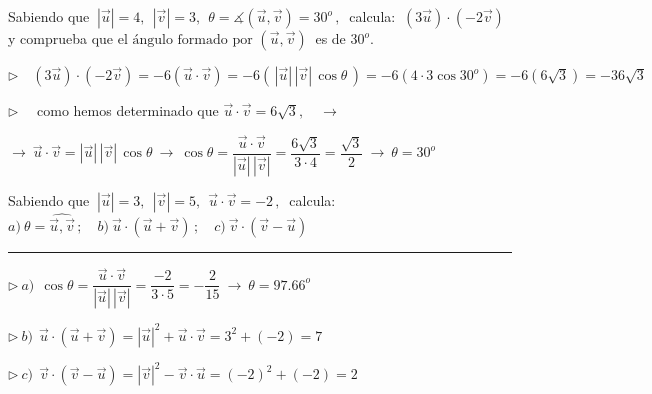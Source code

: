 	

\vspace{5mm}
\begin{miejercicio}

Sabiendo que $\ |\vec u|=4,\ \ |\vec v|=3,\ \ \theta=  \measuredangle (\vec u, \vec v)=30^o \, , \ $ calcula: $\ (3\vec u) \cdot (-2\vec v)\ $ y comprueba que $ \text{el ángulo formado por } (\vec u,\vec v)\ $ es de $30^o$. 

\vspace{4mm} $\triangleright \quad (3\vec u) \cdot (-2\vec v)=-6(\vec u \cdot \vec v)=-6( \, |\vec u|\, |\vec v|\, \cos \theta \, ) = -6(4\cdot 3 \cos 30^o )=-6(6\sqrt
3)=-36\sqrt{3}$

\vspace{4mm} $\triangleright \quad $ como hemos determinado que $\vec u \cdot \vec v=6\sqrt{3}, \quad \to \quad $

\vspace{2mm} $\to \ \vec u \cdot \vec v = |\vec u|\, |\vec v|\, \cos \theta  \ \to \ \cos \theta=\dfrac{\vec u \cdot \vec v}{|\vec u|\, |\vec v|}=\dfrac{6\sqrt{3}}{3\cdot 4}=\dfrac{\sqrt{3}}{2}\ \to \ \theta =30^o$
	
\end{miejercicio}


\begin{miejercicio}

Sabiendo que $\ |\vec u|=3,\ \ |\vec v|=5,\ \ \vec u\cdot \vec v=-2\, , \ $ calcula:
$a)\  \theta = \widehat{\overrightarrow u , \overrightarrow v} \, ;  \quad 
b)\  \vec u \cdot (\vec u + \vec v) \, ; \quad
c)\  \vec v \cdot (\vec v - \vec u)$

\rule{250pt}{0.1pt}

\vspace{2mm} $\triangleright \ a)\ \ \cos \theta =\dfrac{\vec u \cdot \vec v}{|\vec u|\, |\vec v|}=\dfrac{-2}{3\cdot 5} =-\dfrac 2{15} \ \to \ \theta=97.66^o$

\vspace{4mm} $\triangleright \ b)\ \ \vec u \cdot (\vec u + \vec v)= |\vec u|^2 + \vec u \cdot \vec v=3^2+(-2)=7 $


\vspace{4mm} $\triangleright \ c)\ \ \vec v \cdot (\vec v - \vec u)= |\vec v|^2-\vec v \cdot \vec u=(-2)^2+(-2)=2$
	
\end{miejercicio}

	
\vspace{0.5cm}

